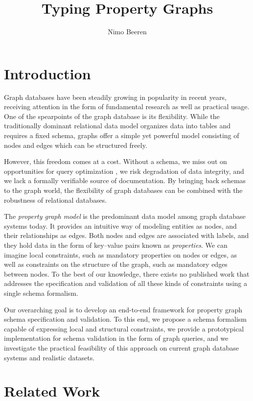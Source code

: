 \documentclass{article}
\title{Typing Property Graphs}
\author{Nimo Beeren}
\theoremstyle{definition}
\begin{document}
\maketitle

\section{Introduction}

Graph databases have been steadily growing in popularity in recent years, receiving attention in the form of fundamental research as well as practical usage. One of the spearpoints of the graph database is its flexibility. While the traditionally dominant relational data model organizes data into tables and requires a fixed schema, graphs offer a simple yet powerful model consisting of nodes and edges which can be structured freely.

However, this freedom comes at a cost. Without a schema, we miss out on opportunities for query optimization \citep{chakravarthy1990logic, buneman1997adding, meier2013semantic}, we risk degradation of data integrity, and we lack a formally verifiable source of documentation. By bringing back schemas to the graph world, the flexibility of graph databases can be combined with the robustness of relational databases.

The \emph{property graph model} is the predominant data model among graph database systems today. It provides an intuitive way of modeling entities as nodes, and their relationships as edges. Both nodes and edges are associated with labels, and they hold data in the form of key--value pairs known as \emph{properties}. We can imagine local constraints, such as mandatory properties on nodes or edges, as well as constraints on the structure of the graph, such as mandatory edges between nodes. To the best of our knowledge, there exists no published work that addresses the specification and validation of all these kinds of constraints using a single schema formalism.

Our overarching goal is to develop an end-to-end framework for property graph schema specification and validation. To this end, we propose a schema formalism capable of expressing local and structural constraints, we provide a prototypical implementation for schema validation in the form of graph queries, and we investigate the practical feasibility of this approach on current graph database systems and realistic datasets.

\section{Related Work}
\end{document}
